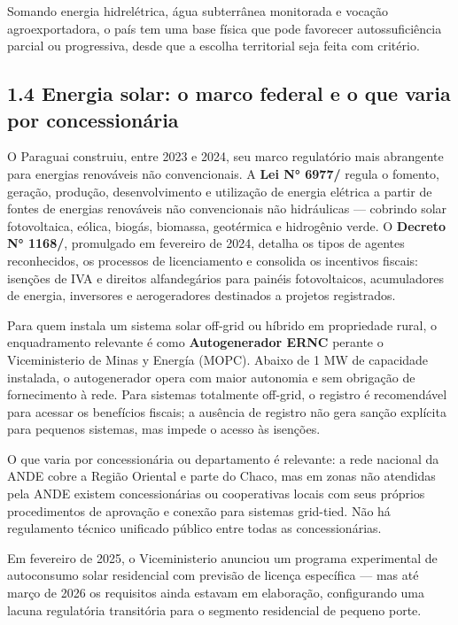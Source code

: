 Somando energia hidrelétrica, água subterrânea monitorada e vocação
agroexportadora, o país tem uma base física que pode favorecer
autossuficiência parcial ou progressiva, desde que a escolha territorial
seja feita com critério.

\subsection{1.4 Energia solar: o marco federal e o que varia por
concessionária}\label{energia-solar-o-marco-federal-e-o-que-varia-por-concessionuxe1ria}

O Paraguai construiu, entre 2023 e 2024, seu marco regulatório mais
abrangente para energias renováveis não convencionais. A \textbf{Lei N°
6977/\allowbreak {}} regula o fomento, geração, produção, desenvolvimento e
utilização de energia elétrica a partir de fontes de energias renováveis
não convencionais não hidráulicas --- cobrindo solar fotovoltaica,
eólica, biogás, biomassa, geotérmica e hidrogênio verde. O
\textbf{Decreto N° 1168/\allowbreak {}}, promulgado em fevereiro de 2024, detalha
os tipos de agentes reconhecidos, os processos de licenciamento e
consolida os incentivos fiscais: isenções de IVA e direitos
alfandegários para painéis fotovoltaicos, acumuladores de energia,
inversores e aerogeradores destinados a projetos registrados.

Para quem instala um sistema solar off-grid ou híbrido em propriedade
rural, o enquadramento relevante é como \textbf{Autogenerador ERNC}
perante o Viceministerio de Minas y Energía (MOPC). Abaixo de 1 MW de
capacidade instalada, o autogenerador opera com maior autonomia e sem
obrigação de fornecimento à rede. Para sistemas totalmente off-grid, o
registro é recomendável para acessar os benefícios fiscais; a ausência
de registro não gera sanção explícita para pequenos sistemas, mas impede
o acesso às isenções.

O que varia por concessionária ou departamento é relevante: a rede
nacional da ANDE cobre a Região Oriental e parte do Chaco, mas em zonas
não atendidas pela ANDE existem concessionárias ou cooperativas locais
com seus próprios procedimentos de aprovação e conexão para sistemas
grid-tied. Não há regulamento técnico unificado público entre todas as
concessionárias.

Em fevereiro de 2025, o Viceministerio anunciou um programa experimental
de autoconsumo solar residencial com previsão de licença específica ---
mas até março de 2026 os requisitos ainda estavam em elaboração,
configurando uma lacuna regulatória transitória para o segmento
residencial de pequeno porte.


